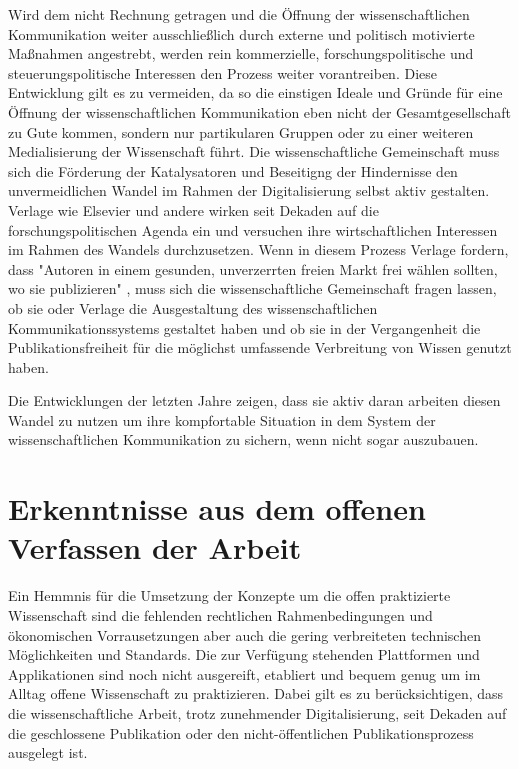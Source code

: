 Wird dem nicht Rechnung getragen und die Öffnung der wissenschaftlichen Kommunikation weiter ausschließlich durch externe und politisch motivierte Maßnahmen angestrebt, werden rein kommerzielle, forschungspolitische und steuerungspolitische Interessen den Prozess weiter vorantreiben. Diese Entwicklung gilt es zu vermeiden, da so die einstigen Ideale und Gründe für eine Öffnung der wissenschaftlichen Kommunikation eben nicht der Gesamtgesellschaft zu Gute kommen, sondern nur partikularen Gruppen oder zu einer weiteren Medialisierung der Wissenschaft führt. Die wissenschaftliche Gemeinschaft muss sich die Förderung der Katalysatoren und Beseitigng der Hindernisse den unvermeidlichen Wandel im Rahmen der Digitalisierung selbst aktiv gestalten. Verlage wie Elsevier und andere wirken seit Dekaden auf die forschungspolitischen Agenda ein und versuchen ihre wirtschaftlichen Interessen im Rahmen des Wandels durchzusetzen. Wenn in diesem Prozess Verlage fordern, dass "Autoren in einem gesunden, unverzerrten freien Markt frei wählen sollten, wo sie publizieren" \cite{Brussels_Declaration_2007}, muss sich die wissenschaftliche Gemeinschaft fragen lassen, ob sie oder Verlage die Ausgestaltung des wissenschaftlichen Kommunikationssystems gestaltet haben und ob sie in der Vergangenheit die Publikationsfreiheit für die möglichst umfassende Verbreitung von Wissen genutzt haben.

Die Entwicklungen der letzten Jahre zeigen, dass sie aktiv daran arbeiten diesen Wandel zu nutzen um ihre kompfortable Situation in dem System der wissenschaftlichen Kommunikation zu sichern, wenn nicht sogar auszubauen.

\section{Erkenntnisse aus dem offenen Verfassen der Arbeit}

Ein Hemmnis für die Umsetzung der Konzepte um die offen praktizierte Wissenschaft sind die fehlenden rechtlichen Rahmenbedingungen und ökonomischen Vorrausetzungen aber auch die gering verbreiteten technischen Möglichkeiten und Standards. Die zur Verfügung stehenden Plattformen und Applikationen sind noch nicht ausgereift, etabliert und bequem genug um im Alltag offene Wissenschaft zu praktizieren. Dabei gilt es zu berücksichtigen, dass die wissenschaftliche Arbeit, trotz zunehmender Digitalisierung, seit Dekaden auf die geschlossene Publikation oder den nicht-öffentlichen Publikationsprozess ausgelegt ist.

